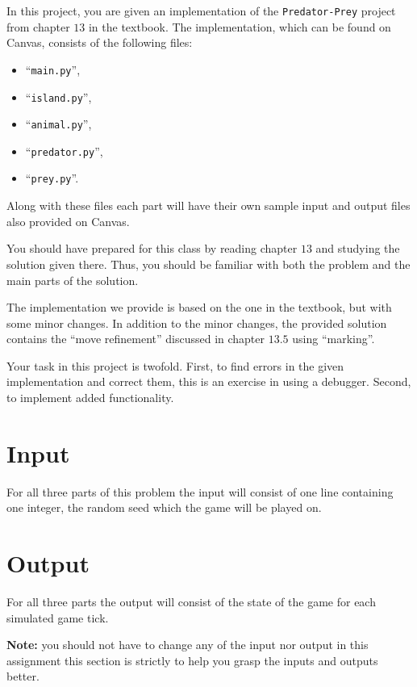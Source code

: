 
In this project, you are given an implementation of the \texttt{Predator-Prey} project from chapter $13$ in the textbook.
The implementation, which can be found on Canvas,
consists of the following files: 
\begin{itemize}
    \item``\texttt{main.py}'', 
    \item``\texttt{island.py}'', 
    \item``\texttt{animal.py}'', 
    \item``\texttt{predator.py}'', 
    \item``\texttt{prey.py}''.
\end{itemize}

Along with these files each part will have their own sample input and output files also provided on Canvas.

You should have prepared for this class by reading chapter $13$ and studying the solution given there.
Thus, you should be familiar with both the problem and the main parts of the solution.

The implementation we provide is based on the one in the textbook, but with some minor changes.
In addition to the minor changes, the provided solution contains the ``move refinement'' discussed in chapter $13.5$ using ``marking''.

Your task in this project is twofold.
First, to find errors in the given implementation and correct them, this is an exercise in using a debugger.
Second, to implement added functionality.

\section*{Input}

For all three parts of this problem the input will consist of one line 
containing one integer, the random seed which the game will be played on.

\section*{Output}

For all three parts the output will consist of the state of the game for each
simulated game tick.

\textbf{Note:} you should not have to change any of the input nor output in this assignment
this section is strictly to help you grasp the inputs and outputs better.
